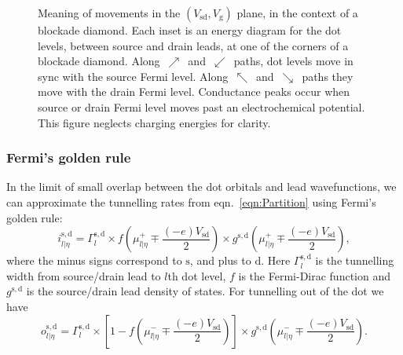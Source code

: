 \documentclass[a4paper,11pt]{article}
\begin{document}
\begin{figure}[p]
\begin{center}
{}
        \caption{Meaning of movements in the $\left(V_\mathrm{sd},V_\mathrm{g}\right)$ plane, in the context of a blockade diamond. Each inset is an energy diagram for the dot levels, between source and drain leads, at one of the corners of a blockade diamond. Along~$\nearrow$~and~$\swarrow$~paths, dot levels move in sync with the source Fermi level. Along~$\nwarrow$~and~$\searrow$~paths they move with the drain Fermi level. Conductance peaks occur when source or drain Fermi level moves past an electrochemical potential. This figure neglects charging energies for clarity.}
        \label{fig:Directions}
    \end{center}
    \end{figure}

    \subsubsection{Fermi's golden rule}
    In the limit of small overlap between the dot orbitals and lead wavefunctions, we can approximate the tunnelling rates from eqn.~\ref{eqn:Partition} using Fermi's golden rule:
    \begin{equation}\label{eqn:Tunnel_rate_in}
        i_{l|\eta}^\mathrm{s,d} = \Gamma^\mathrm{s,d}_l \times f{\left(\mu^+_{l|\eta} \mp \frac{\left(-e\right)V_\mathrm{sd}}{2}\right)} \times g^\mathrm{s,d}{\left(\mu^+_{l|\eta} \mp \frac{\left(-e\right)V_\mathrm{sd}}{2}\right)},
    \end{equation}
    where the minus signs correspond to $\mathrm{s}$, and plus to $\mathrm{d}$. Here $\Gamma^\mathrm{s,d}_l$ is the tunnelling width from source/drain lead to $l$th dot level, $f$ is the Fermi-Dirac function and $g^\mathrm{s,d}$ is the source/drain lead density of states. For tunnelling out of the dot we have
    \begin{equation}\label{eqn:Tunnel_rate_out}
        o_{l|\eta}^\mathrm{s,d} = \Gamma^\mathrm{s,d}_l \times \left[1 - f{\left(\mu^-_{l|\eta} \mp \frac{\left(-e\right)V_\mathrm{sd}}{2}\right)}\right] \times g^\mathrm{s,d}{\left(\mu^-_{l|\eta} \mp \frac{\left(-e\right)V_\mathrm{sd}}{2}\right)} .
    \end{equation}
\end{document}
